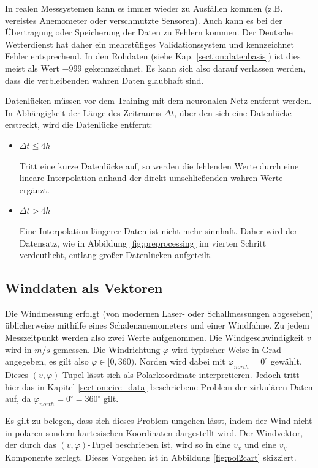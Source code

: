 \documentclass[
12pt, %
toc=listofnumbered, %
toc=chapterentrydotfill, %
numbers=noenddot, %
captions=tableheading, %
bibliography=numbered
]{scrreprt}
\let\Oldsubsection\subsection
\renewcommand{\subsection}{\FloatBarrier\Oldsubsection}
\newcommand{\qm}[1]{\glqq#1\grqq{}} %
\begin{document}
In realen Messsystemen kann es immer wieder zu Ausfällen kommen (z.B. vereistes Anemometer oder verschmutzte Sensoren). Auch kann es bei der Übertragung oder Speicherung der Daten zu Fehlern kommen. Der Deutsche Wetterdienst hat daher ein mehrstüfiges Validationssystem und kennzeichnet Fehler entsprechend. In den Rohdaten (siehe Kap. \ref{section:datenbasis}) ist dies meist als Wert $-999$ gekennzeichnet. Es kann sich also darauf verlassen werden, dass die verbleibenden \qm{wahren} Daten glaubhaft sind. 

Datenlücken müssen vor dem Training mit dem neuronalen Netz entfernt werden. In Abhängigkeit der Länge des Zeitraums $\Delta t$, über den sich eine Datenlücke erstreckt, wird die Datenlücke entfernt:

\begin{itemize}
	\item $\Delta t \leq 4h$
	
	Tritt eine kurze Datenlücke auf, so werden die fehlenden Werte durch eine lineare Interpolation anhand der direkt umschließenden wahren Werte ergänzt.

	\item $\Delta t > 4h$

	Eine Interpolation längerer Daten ist nicht mehr sinnhaft. Daher wird der Datensatz, wie in Abbildung \ref{fig:preprocessing} im vierten Schritt verdeutlicht, entlang großer Datenlücken aufgeteilt.

\end{itemize}

\subsection{Winddaten als Vektoren}\label{section:Winddaten_vec}
Die Windmessung erfolgt (von modernen Laser- oder Schallmessungen abgesehen) üblicherweise mithilfe eines Schalenanemometers und einer Windfahne. Zu jedem Messzeitpunkt werden also zwei Werte aufgenommen. Die Windgeschwindigkeit $v$ wird in $m/s$ gemessen. Die Windrichtung $\varphi$ wird typischer Weise in Grad angegeben, es gilt also $\varphi \in [0,360)$. Norden wird dabei mit $\varphi_{north} = 0^\circ$ gewählt. Dieses $(v,\varphi)$-Tupel lässt sich als Polarkoordinate interpretieren. Jedoch tritt hier das in Kapitel \ref{section:circ_data} beschriebene Problem der zirkulären Daten auf, da $\varphi_{north} = 0^\circ = 360^\circ$ gilt.

Es gilt zu belegen, dass sich dieses Problem umgehen lässt, indem der Wind nicht in polaren sondern kartesischen Koordinaten dargestellt wird. Der Windvektor, der durch das $(v,\varphi)$-Tupel beschrieben ist, wird so in eine $v_x$ und eine $v_y$ Komponente zerlegt. Dieses Vorgehen ist in Abbildung \ref{fig:pol2cart} skizziert.
\end{document}
